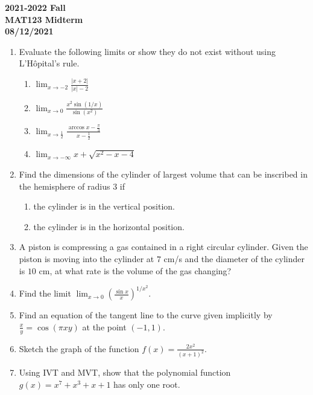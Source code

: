 \documentclass[a4paper, 12pt]{article}
\begin{document}
\pagestyle{empty}

\begin{center}
\textbf{2021-2022 Fall\\MAT123 Midterm\\08/12/2021}
\end{center}

\begin{enumerate}[leftmargin=*,label=\textbf{\arabic*.}]

\item Evaluate the following limits or show they do not exist without using L'Hôpital's rule.

\begin{enumerate}[leftmargin=*,label=\textbf{\alph*.}]
\item $\displaystyle \lim_{x\to-2}\frac{\left|x+2\right|}{\left|x\right|-2}$
\item $\displaystyle\lim_{x\to0}\frac{x^2\sin(1/x)}{\sin\left(x^2\right)}$
\item $\displaystyle \lim_{x\to\frac12}\frac{\arccos x- \frac\pi3}{x-\frac12}$
\item $\displaystyle\lim_{x\to-\infty}x+\sqrt{x^2-x-4}$
\end{enumerate}

\item Find the dimensions of the cylinder of largest volume that can be inscribed in the hemisphere of radius $3$ if

\begin{enumerate}[leftmargin=*,label=\textbf{\alph*.}]
\item the cylinder is in the vertical position.
\item the cylinder is in the horizontal position.
\end{enumerate}

\item A piston is compressing a gas contained in a right circular cylinder. Given the piston is moving into the cylinder at $7 $ cm/s and the diameter of the cylinder is $10$ cm, at what rate is the volume of the gas changing?

\item Find the limit $\displaystyle\lim_{x\to0}\left(\frac{\sin x}x\right)^{1/x^2}$.

\item Find an equation of the tangent line to the curve given implicitly by $\displaystyle \frac xy=\cos\left(\pi xy\right)$ at the point $(-1,1)$.

\item Sketch the graph of the function $\displaystyle f(x)=\frac{2x^2}{\left(x+1\right)^2}$.

\item Using IVT and MVT, show that the polynomial function $g(x) = x^7+x^3+x+1$ has only one root.
\end{enumerate}
\end{document}
